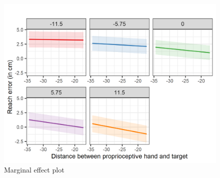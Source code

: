 \begin{figure}[t]
\centering       
    \includegraphics[scale=0.7]{Images/margeff.png}
    \caption{Marginal effect plot}
    \label{fig:exp2-margeff}
\end{figure}